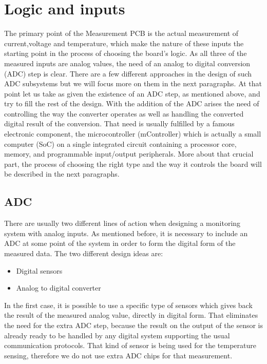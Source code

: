 \section{Logic and inputs}
The primary point of the Measurement PCB is the actual measurement of current,voltage and temperature, which make the nature of these inputs the starting point in the process of choosing the board's logic. As all three of the measured inputs are analog values, the need of an analog to digital conversion (ADC) step is clear. There are a few different approaches in the design of such ADC subsystems but we will focus more on them in the next paragraphs. At that point let us take as given the existence of an ADC step, as mentioned above, and try to fill the rest of the design. With the addition of the ADC arises the need of controlling the way the converter operates as well as handling the converted digital result of the conversion. That need is usually fulfilled by a famous electronic component, the microcontroller (mController) which is actually a small computer (SoC) on a single integrated circuit containing a processor core, memory, and programmable input/output peripherals. \cite{mController} More about that crucial part, the process of choosing the right type and the way it controls the board will be described in the next paragraphs.

\subsection{ADC}
There are usually two different lines of action when designing a monitoring system with analog inputs. As mentioned before, it is necessary to include an ADC at some point of the system in order to form the digital form of the measured data. The two different design ideas are:

\begin{itemize}
  \item Digital sensors
  \item Analog to digital converter
\end{itemize}

In the first case, it is possible to use a specific type of sensors which gives back the result of the measured analog value, directly in digital form. That eliminates the need for the extra ADC step, because the result on the output of the sensor is already ready to be handled by any digital system supporting the usual communication protocols. That kind of sensor is being used for the temperature sensing, therefore we do not use extra ADC chips for that measurement.

